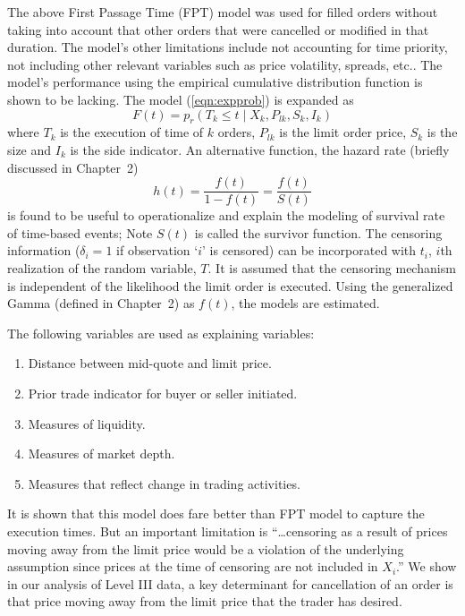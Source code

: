 The above First Passage Time (FPT) model was used for filled orders without taking into account that other orders that were cancelled or modified in that duration. The model's other limitations include not accounting for time priority, not including other relevant variables such as price volatility, spreads, etc.. The model's performance using the empirical cumulative distribution function is shown to be lacking. The model (\ref{eqn:expprob}) is expanded as
	\begin{equation}\label{eqn:cumexpmodel}
	F(t)=p_r(T_k \leq t \;|\; X_k,P_{lk}, S_k, I_k)
	\end{equation}
where $T_k$ is the execution of time of $k$ orders, $P_{lk}$ is the limit order price, $S_k$ is the size and $I_k$ is the side indicator. An alternative function, the hazard rate (briefly discussed in Chapter~2)
	\begin{equation}\label{eqn:hazard}
	h(t)=\dfrac{f(t)}{1-f(t)}= \dfrac{f(t)}{S(t)}
	\end{equation}
is found to be useful to operationalize and explain the modeling of survival rate of time-based events; Note $S(t)$ is called the survivor function. The censoring information ($\delta_i=1$ if observation `$i$' is censored) can be incorporated with $t_i$, $i$th realization of the random variable, $T$. It is assumed that the censoring mechanism is independent of the likelihood the limit order is executed. Using the generalized Gamma (defined in Chapter~2) as $f(t)$, the models are estimated.


The following variables are used as explaining variables:
\begin{enumerate}[--]
\item Distance between mid-quote and limit price.
\item Prior trade indicator for buyer or seller initiated.
\item Measures of liquidity.
\item Measures of market depth.
\item Measures that reflect change in trading activities. 
\end{enumerate}
It is shown that this model does fare better than FPT model to capture the execution times. But an important limitation is ``\dots censoring as a result of prices moving away from the limit price would be a violation of the underlying assumption since prices at the time of censoring are not included in $X_i$.'' We show in our analysis of Level III data, a key determinant for cancellation of an order is that price moving away from the limit price that the trader has desired. 



